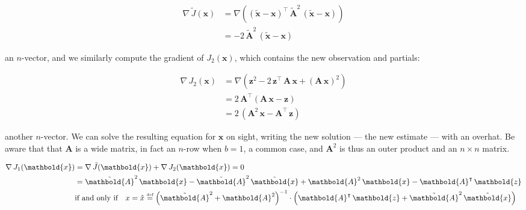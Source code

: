 \documentclass[10pt,oneside,x11names]{article}
\begin{document}
\begin{align*}
\nabla{}\,
{\tilde{J}}(\mathbold{x}) &=
\nabla{}
\left(
(\tilde{\mathbold{x}}-\mathbold{x})^\intercal\,
{\tilde{\mathbold{A}}^2}\,
(\tilde{\mathbold{x}}-\mathbold{x})
\right) \\ &=
-2\,
{\tilde{\mathbold{A}}^2}\,
(\tilde{\mathbold{x}}-\mathbold{x})
\end{align*}

\noindent an \mbox{$n$-vector}, and we similarly compute the gradient of
\(J_2(\mathbold{x})\), which contains the new observation and partials:

\begin{align*}
\nabla\,
J_2(\mathbold{x})
&=
\nabla
\left(
\mathbold{z}^2 -
2\,
\mathbold{z}^\intercal\,
\mathbold{A}\,
\mathbold{x} +
\left(
\mathbold{A}\,
\mathbold{x}
\right)^2
\right)
\\
&=
2\,
\mathbold{A}^\intercal
\left(
\mathbold{A}\,
\mathbold{x} -
\mathbold{z}
\right)
\\
&=
2\,
\left(
\mathbold{A}^2\,
\mathbold{x}-
\mathbold{A}^\intercal\,
\mathbold{z}
\right)
\end{align*}

\noindent another \mbox{$n$-vector}. We can solve the resulting equation for
\(\mathbold{x}\) on sight, writing the new solution --- the new estimate ---
with an overhat. Be aware that
that \(\mathbold{A}\) is a wide matrix, in fact   an \mbox{$n$-row} when \(b=1\), a
common case, and 
\(\mathbold{A}^2\) is thus an outer product and an \(n\times{n}\) matrix.


\begin{align}
\notag
\nabla{}\,
J_1(\mathbold{x}) 
&= 
\nabla{}\,
{\tilde{J}}
(\mathbold{x}) + 
\nabla{}\,
J_2(\mathbold{x}) 
= 0
\\
\notag
&=
{\tilde{\mathbold{A}}}^2\,
\mathbold{x} -
{\tilde{\mathbold{A}}}^2\,
{\tilde{\mathbold{x}}} +
\mathbold{A}^2\,
\mathbold{x} - 
\mathbold{A}^\intercal{}\,
\mathbold{z}
\\
\label{eqn:def-of-posterior-estimate}
&
\text{if and only if}\quad
x=\hat{x}
\stackrel{\text{\tiny def}}{=}
\left(
{\tilde{\mathbold{A}}}^2 + 
\mathbold{A}^2
\right)^{-1}
\cdot
\left(
\mathbold{A}^\intercal\,
\mathbold{z} + 
{\tilde{\mathbold{A}}}^2\,
{\tilde{\mathbold{x}}}
\right)
\end{align}
\end{document}
